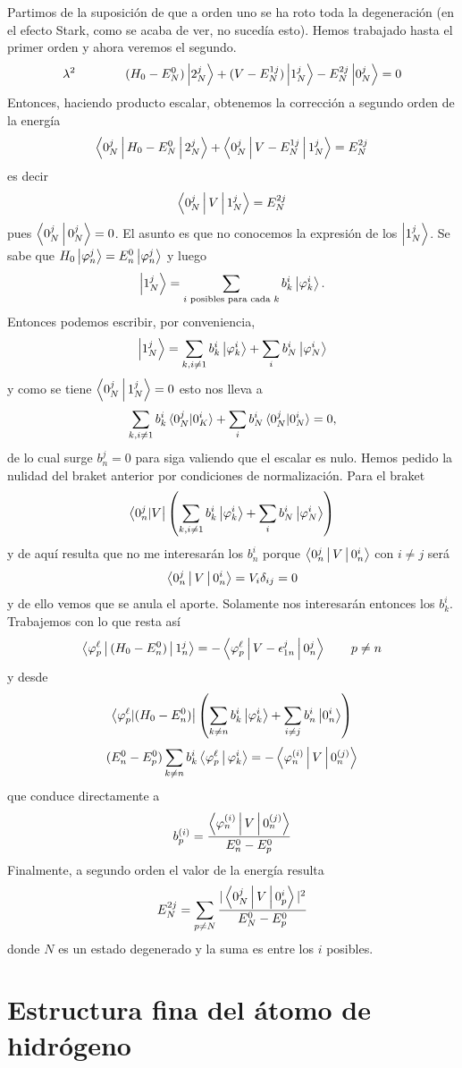 \documentclass[10pt,oneside]{CBFT_book}
\begin{document}
Partimos de la suposición de que a orden uno se ha roto toda la degeneración (en el efecto
Stark, como se acaba de ver, no sucedía esto). Hemos trabajado hasta el primer orden y
ahora veremos el segundo.
\[
	\lambda^2 \qquad \qquad (H_0 - E_N^0) \Ket{2_N^j} + (V - E_N^{1 j}) 
	\Ket{1_N^j} - E_N^{2 j} \Ket{0_N^j} = 0
\]
Entonces, haciendo producto escalar, obtenemos la corrección a segundo orden de la energía 
\[
	\Braket{0_N^j | H_0 - E_N^0 | 2_N^j} + \Braket{ 0_N^j | V - E_N^{1 j} | 1_N^j} = E_N^{2 j}
\]
es decir
\[
	\Braket{ 0_N^j | V | 1_N^j} = E_N^{2 j}
\]
pues $\Braket{0_N^j|0_N^j}= 0$.
El asunto es que no conocemos la expresión de los $\Ket{1_N^j}$. Se sabe que $ H_0 \Ket{\varphi_n^j} = 
E_n^0 \Ket{\varphi_n^j}$ y luego 
\[
	\Ket{1_N^j} = \sum_{ i \text{ posibles para cada } k } b_k^i \Ket{\varphi_k^i}.
\]
Entonces podemos escribir, por conveniencia,
\[
	\Ket{1_N^j} = \sum_{k,i\neq 1} b_k^i \Ket{\varphi_k^i} + \sum_i b_N^i \Ket{\varphi_N^i}
\]
y como se tiene $\Braket{0_N^j|1_N^j} = 0$ esto nos lleva a 
\[
	\sum_{k,i\neq 1} b_k^i \braket{0_N^j|0_K^i} + 
		\sum_i b_N^i \braket{0_N^j|0_N^i} = 0,
\]
de lo cual surge $ b_n^j = 0 $ para siga valiendo que el escalar es nulo. Hemos pedido la nulidad
del braket anterior por condiciones de normalización.
Para el braket 
\[
	\Bra{0_n^j | V } \left( \sum_{k,i\neq 1} b_k^i \Ket{\varphi_k^i} + 
	\sum_i b_N^i \Ket{\varphi_N^i} \right)
\]
y de aquí resulta que no me interesarán los $b_n^i$ porque $ \Braket{0_n^j|V|0_n^i} $ con $ i \neq j $ será
\[
	\Braket{0_n^j|V|0_n^i} = V_i \delta_{ij} = 0 
\]
y de ello vemos que se anula el aporte. Solamente nos interesarán entonces los $b_k^i$.
Trabajemos con lo que resta así
\[
	\Braket{\varphi_p^\ell | (H_0 - E_n^0) | 1_n^j } = 
	- \Braket{ \varphi_p^\ell | V - \epsilon_{1n}^j | 0_n^j  } \qquad p \neq n
\]
y desde
\[
	\Bra{ \varphi_p^\ell | (H_0 - E_n^0) } \left( \sum_{k \neq n} b_k^i \Ket{\varphi_k^i} + 
	\sum_{i \neq j} b_n^i \Ket{ 0_n^i} \right)
\]
\[
	( E_n^0 - E_p^0 ) \sum_{k \neq n} b_k^i \Braket{\varphi_p^\ell | \varphi_k^i } =
	- \Braket{\varphi_n^{(i)} | V | 0_n^{(j)} } 
\]
que conduce directamente a 
\[
	b_p^{(i)} = \frac{\Braket{ \varphi_n^{(i)} | V | 0_n^{(j)} } }{E_n^0 - E_p^0}
\]
Finalmente, a segundo orden el valor de la energía resulta
\[
	E_N^{2j} = \sum_{p\neq N} \frac{|\Braket{0_N^j|V|0_p^i}|^2}{E_N^0 - E_p^0}
\]
donde $N$ es un estado degenerado y la suma es entre los $i$ posibles.

\section{Estructura fina del átomo de hidrógeno}
\end{document}
